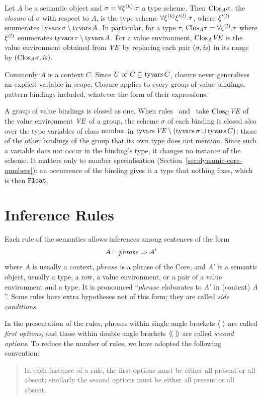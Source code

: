 Let $A$ be a semantic object and $\sigma = \forall\xi^{(k)}.\tau$ a type
scheme. Then $\mathrm{Clos}_A \sigma$, the \emph{closure} of $\sigma$ with respect to
$A$, is the type scheme $\forall\xi^{(k)}\xi'^{(l)}.\tau$, where
$\xi'^{(l)}$ enumerates $\mathrm{tyvars}\,\sigma \setminus \mathrm{tyvars}\, A$. In
particular, for a type $\tau$, $\mathrm{Clos}_A \tau = \forall\xi^{(l)}.\tau$
where $\xi^{(l)}$ enumerates $\mathrm{tyvars}\,\tau \setminus \mathrm{tyvars}\, A$. For a
value environment, $\mathrm{Clos}_A \mathit{VE}$ is the value environment obtained from $\mathit{VE}$
by replacing each pair $(\sigma, \mathit{is})$ in its range by $(\mathrm{Clos}_A \sigma, \mathit{is})$.

Commonly $A$ is a context $C$. Since $U \mathrel{\mathrm{of}} C \subseteq \mathrm{tyvars}\, C$, closure
never generalises an explicit variable in scope. Closure applies to every group
of value bindings, pattern bindings included, whatever the form of their
expressions.

A group of value bindings is closed as one. When
rules~ and~ take
$\mathrm{Clos}_C \mathit{VE}$ of the value environment $\mathit{VE}$ of a group, the scheme $\sigma$ of
each binding is closed also over the type variables of class $\mathrm{number}$ in
$\mathrm{tyvars}\,\mathit{VE} \setminus (\mathrm{tyvars}\,\sigma \cup \mathrm{tyvars}\, C)$: those of the other
bindings of the group that its own type does not mention. Since such a variable
does not occur in the binding's type, it changes no instance of the scheme. It
matters only to number specialisation
(Section~\ref{sec:dynamic-core-numbers}): an occurrence of the binding gives it
a type that nothing fixes, which is then $\mathtt{Float}$. %

\section{Inference Rules}\label{sec:static-core-rules}

Each rule of the semantics allows inferences among sentences of the form
\[
  A \vdash \mathit{phrase} \Rightarrow A'
\]
where $A$ is usually a context, $\mathit{phrase}$ is a phrase of the Core, and
$A'$ is a semantic object, usually a type, a row, a value environment, or a pair
of a value environment and a type. It is pronounced ``$\mathit{phrase}$
elaborates to $A'$ in (context) $A$''. Some rules have extra hypotheses not of
this form; they are called \emph{side conditions}.

In the presentation of the rules, phrases within single angle brackets
$\langle \ \rangle$ are called \emph{first options}, and those within double angle
brackets $\langle\!\langle \ \rangle\!\rangle$ are called \emph{second options}. To reduce the number of
rules, we have adopted the following convention:
\begin{quote}
In each instance of a rule, the first options must be either all present or all
absent; similarly the second options must be either all present or all absent.
\end{quote}

